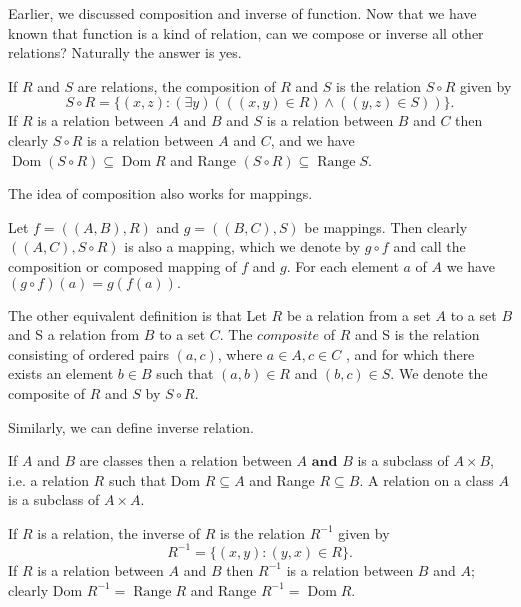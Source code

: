     Earlier, we discussed composition and inverse of function. Now that we have known that function is a kind of 
    relation, can we compose or inverse all other relations? Naturally the answer is yes.

    \begin{definition}
        If $R$ and $S$ are relations, the composition of $R$ and $S$ is the relation $S\circ R$ given by
        $$
        S\circ R=\{(x,z):(\exists y)(((x,y)\in R)\wedge((y,z)\in S))\}.
        $$
        If $R$ is a relation between $A$ and $B$ and $S$ is a relation between $B$ and $C$ then clearly 
        $S\circ R$ is a relation between $A$ and $C$, and we have $\operatorname{Dom}\left(S\circ R\right)\subseteq\operatorname{Dom}R$ and Range $(S\circ R)\subseteq\operatorname{Range}S.$
    \end{definition}
    The idea of composition also works for mappings.
\begin{definition}
    Let $f= ( ( A, B) , R) $ and $g= ( ( B, C) , S) $ be mappings. Then clearly 
    $((A,C),S\circ R)$ is also a mapping, which we denote by $g\circ f$ and call the composition or 
    composed mapping of $f$ and $g$. For each element $a$ of $A$ we have $( g\circ f) ( a) = g( f( a) ).$

\end{definition}
\begin{remark}
	The other equivalent definition is that
	Let $R$ be a relation from a set $A$ to a set $B$ and S a relation from $B$ to a set $C$. The $composite$ of $R$ and S is the relation consisting of ordered pairs $(a,c)$, where $a\in A, c\in C$ , and for which there exists an element $b\in B$ such that $( a, b) \in R$ and $( b, c) \in S.$ We denote the composite of $R$ and $S$ by $S\circ R.$
\end{remark}
    Similarly, we can define inverse relation.
    \begin{definition}
        If $A$ and $B$ are classes then a relation between $A\textbf{ and }B$ is a subclass of $A\times B$, 
        i.e. a relation $R$ such that Dom $R\subseteq A$ and Range $R\subseteq B.$ A relation on a class $A$ 
        is a subclass of $A\times A.$

        If $R$ is a relation, the inverse of $R$ is the relation $R^{-1}$ given by
        $$
        R^{-1}=\{(x,y):(y,x)\in R\}.
        $$
        If $R$ is a relation between $A$ and $B$ then $R^{-1}$ is a relation between $B$ and $A;$ 
        clearly Dom $R^{-1}=\operatorname{Range}R$ and Range $R^{-1}=\operatorname{Dom}R.$
    \end{definition}


